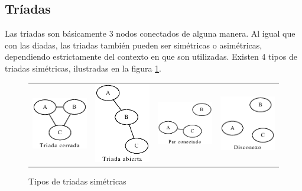 \subsection{Tríadas}

Las triadas son básicamente 3 nodos conectados de alguna manera. Al igual que con las diadas, las triadas también pueden ser simétricas o asimétricas, dependiendo estrictamente del contexto en que son utilizadas. Existen 4 tipos de triadas simétricas, ilustradas en la figura \ref{fig:tipos_triadas_simetricas}.

\begin{figure}[!htb]
  \begin{center}
      \begin{tabular}{m{3cm}|m{3cm}|m{3cm}|m{3cm}}
        \includegraphics[width=3cm]{./imagenes/triada_simetrica_1.eps} & 
        \includegraphics[width=3cm]{./imagenes/triada_simetrica_2.eps} & 
        \includegraphics[width=3cm]{./imagenes/triada_simetrica_3.eps} & 
        \includegraphics[width=3cm]{./imagenes/triada_simetrica_4.eps}\\
      \end{tabular}
    \caption{Tipos de triadas simétricas}
    \label{fig:tipos_triadas_simetricas}
  \end{center}
\end{figure}

